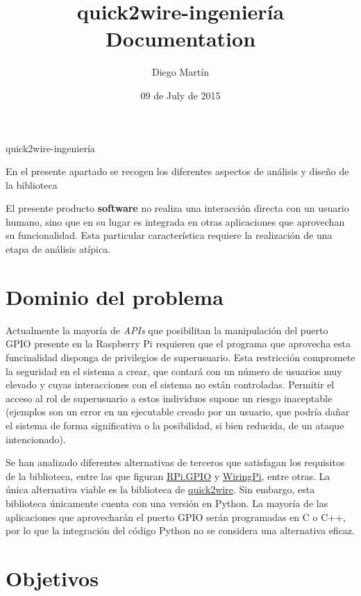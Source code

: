 \documentclass[letterpaper,10pt,spanish]{sphinxmanual}
\title{quick2wire-ingeniería Documentation}
\date{09 de July de 2015}
\author{Diego Martín}
\begin{document}
\maketitle
\tableofcontents
{}\label{index::doc}
quick2wire-ingeniería

En el presente apartado se recogen los diferentes aspectos de análisis y diseño de la biblioteca



El presente producto \textbf{software} no realiza una interacción directa con un usuario humano, sino que en su lugar es integrada en otras aplicaciones que aprovechan su funcionalidad. Esta particular característica requiere la realización de una etapa de análisis atípica.


\chapter{Dominio del problema}
\label{analysis/domain:fase-de-analisis}\label{analysis/domain::doc}\label{analysis/domain:dominio-del-problema}
Actualmente la mayoría de \emph{APIs} que posibilitan la manipulación del puerto GPIO presente en la Raspberry Pi requieren que el programa que aprovecha esta funcinalidad disponga de privilegios de superusuario. Esta restricción compromete la seguridad en el sistema a crear, que contará con un número de usuarios muy elevado y cuyas interacciones con el sistema no están controladas. Permitir el acceso al rol de superusuario a estos individuos supone un riesgo inaceptable (ejemplos son un error en un ejecutable creado por un usuario, que podría dañar el sistema de forma significativa o la posibilidad, si bien reducida, de un ataque intencionado).

Se han analizado diferentes alternativas de terceros que satisfagan los requisitos de la biblioteca, entre las que figuran \href{https://pypi.python.org/pypi/RPi.GPIO}{RPi.GPIO} y \href{http://wiringpi.com/}{WiringPi}, entre otras. La única alternativa viable es la biblioteca de \href{https://github.com/quick2wire/quick2wire-python-api}{quick2wire}. Sin embargo, esta biblioteca únicamente cuenta con una versión en Python. La mayoría de las aplicaciones que aprovecharán el puerto GPIO serán programadas en C o C++, por lo que la integración del código Python no se considera una alternativa eficaz.


\chapter{Objetivos}
\label{analysis/goals::doc}\label{analysis/goals:objetivos}
\end{document}
